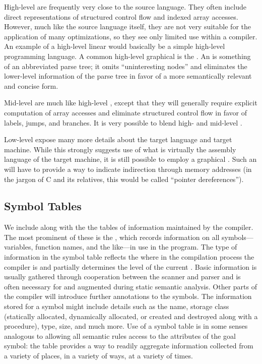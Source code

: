 High-level \IRs are frequently very close to the source language. They often include direct representations of structured control flow and indexed array accesses. However, much like the source language itself, they are not very suitable for the application of many optimizations, so they see only limited use within a compiler. An example of a high-level linear \IR would basically be a simple high-level programming language. A common high-level graphical \IR is the . An \AST is something of an abbreviated parse tree; it omits ``uninteresting nodes'' and eliminates the lower-level information of the parse tree in favor of a more semantically relevant and concise form.

Mid-level \IRs are much like high-level \IRs{}, except that they will generally require explicit computation of array accesses and eliminate structured control flow in favor of labels, jumps, and branches. It is very possible to blend high- and mid-level \IRs{}.

Low-level \IRs expose many more details about the target language and target machine. While this strongly suggests use of what is virtually the assembly language of the target machine, it is still possible to employ a graphical \IR{}. Such an \IR will have to provide a way to indicate indirection through memory addresses (in the jargon of C and its relatives, this would be called ``pointer dereferences'').

\subsection{Symbol Tables}
We include along with the \IR{} the tables of information maintained by the compiler. The most prominent of these is the , which records information on all symbols---variables, function names, and the like---in use in the program. The type of information in the symbol table reflects the where in the compilation process the compiler is and partially determines the level of the current \IR. Basic information is usually gathered through cooperation between the scanner and parser and is often necessary for and augmented during static semantic analysis. Other parts of the compiler will introduce further annotations to the symbols. The information stored for a symbol might include details such as the name, storage class (statically allocated, dynamically allocated, or created and destroyed along with a procedure), type, size, and much more. Use of a symbol table is in some senses analogous to allowing all semantic rules access to the attributes of the goal symbol: the table provides a way to readily aggregate information collected from a variety of places, in a variety of ways, at a variety of times.

